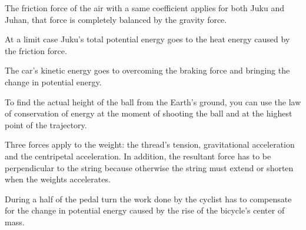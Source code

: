 \documentclass[11pt]{article}
\begin{document}

\hinteng
The friction force of the air with a same coefficient applies for both Juku and Juhan, that force is completely balanced by the gravity force.
\probend
\bigskip


\hinteng
At a limit case Juku’s total potential energy goes to the heat energy caused by the friction force.
\probend
\bigskip


\hinteng
The car’s kinetic energy goes to overcoming the braking force and bringing the change in potential energy.
\probend
\bigskip


\hinteng
To find the actual height of the ball from the Earth’s ground, you can use the law of conservation of energy at the moment of shooting the ball and at the highest point of the trajectory.
\probend
\bigskip


\hinteng
Three forces apply to the weight: the thread’s tension, gravitational acceleration and the centripetal acceleration. In addition, the resultant force has to be perpendicular to the string because otherwise the string must extend or shorten when the weights accelerates.
\probend
\bigskip


\hinteng
During a half of the pedal turn the work done by the cyclist has to compensate for the change in potential energy caused by the rise of the bicycle’s center of mass.
\probend
\bigskip

\end{document}

